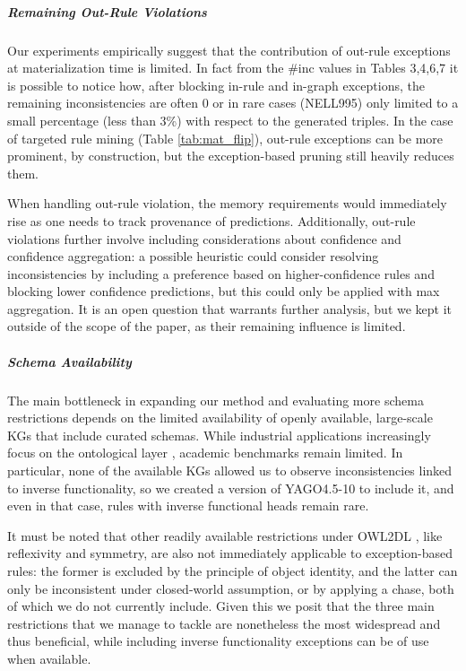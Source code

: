 \documentclass[a4paper,UKenglish,cleveref, autoref, thm-restate]{tgdk-v2021}
\begin{document}
\subparagraph{Remaining Out-Rule Violations} 
Our experiments empirically suggest that the contribution of out-rule exceptions at materialization time is limited. In fact from the \#inc values in Tables 3,4,6,7 it is possible to notice how, after blocking in-rule and in-graph exceptions, the remaining inconsistencies are often 0 or in rare cases (NELL995) only limited to a small percentage (less than 3\%) with respect to the generated triples. In the case of targeted rule mining (Table \ref{tab:mat_flip}), out-rule exceptions can be more prominent, by construction, but the exception-based pruning still heavily reduces them.

When handling out-rule violation, the memory requirements would immediately rise as one needs to track provenance of predictions. Additionally, out-rule violations further involve including considerations about confidence and confidence aggregation: a possible heuristic could consider resolving inconsistencies by including a preference based on higher-confidence rules and blocking lower confidence predictions, but this could only be applied with max aggregation. It is an open question that warrants further analysis, but we kept it outside of the scope of the paper, as their remaining influence is limited.

\subparagraph{Schema Availability} 
The main bottleneck in expanding our method and evaluating more schema restrictions depends on the limited availability of openly available, large-scale KGs that include curated schemas. While industrial applications increasingly focus on the ontological layer \cite{hofer_construction_2024}, academic benchmarks remain limited. In particular, none of the available KGs allowed us to observe inconsistencies linked to inverse functionality, so we created a version of YAGO4.5-10 to include it, and even in that case, rules with inverse functional heads remain rare. 

It must be noted that other readily available restrictions under OWL2DL \cite{motik_owl_2012}, like reflexivity and symmetry, are also not immediately applicable to exception-based rules: the former is excluded by the principle of object identity, and the latter can only be inconsistent under closed-world assumption, or by applying a chase, both of which we do not currently include. Given this we posit that the three main restrictions that we manage to tackle are nonetheless the most widespread and thus beneficial, while including inverse functionality exceptions can be of use when available.
\end{document}

